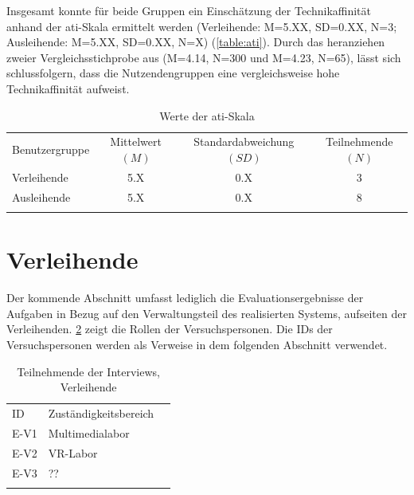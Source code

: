 Insgesamt konnte für beide Gruppen ein Einschätzung der Technikaffinität anhand
der \ac{ati}-Skala ermittelt werden (Verleihende: M=5.XX, SD=0.XX, N=3;
Ausleihende: M=5.XX, SD=0.XX, N=X) (\ref{table:ati}). Durch das heranziehen
zweier Vergleichsstichprobe aus  (M=4.14, N=300 und
M=4.23, N=65), lässt sich schlussfolgern, dass die Nutzendengruppen eine
vergleichsweise hohe Technikaffinität aufweist.


\begin{table}[h]
  \centering
  \caption{Werte der \ac{ati}-Skala}
  \begin{tabular}{lccc}
    \arrayrulecolor{maincolor}\hline
    \sffamily\color{maincolor}Benutzergruppe            &
    \sffamily\color{maincolor}Mittelwert $(M)$          &
    \sffamily\color{maincolor}Standardabweichung $(SD)$ &
    \sffamily\color{maincolor}Teilnehmende $(N)$                        \\
    \arrayrulecolor{maincolor}\hline
    Verleihende                                         & 5.X & 0.X & 3 \\
    Ausleihende                                         & 5.X & 0.X & 8 \\
    \arrayrulecolor{maincolor}\hline
  \end{tabular}
  \label{table:atipartzwei}
\end{table}


\section{Verleihende}
Der kommende Abschnitt umfasst lediglich die Evaluationsergebnisse der Aufgaben
in Bezug auf den Verwaltungsteil des realisierten Systems, aufseiten der
Verleihenden. \ref{table:vzwei} zeigt die Rollen der Versuchspersonen. Die IDs
der Versuchspersonen werden als Verweise in dem folgenden Abschnitt verwendet.

\begin{table}[h]
  \centering
  \caption{Teilnehmende der Interviews, Verleihende}
  \begin{tabular}{lll}
    \arrayrulecolor{maincolor}\hline
    \sffamily\color{maincolor}ID &
    \sffamily\color{maincolor}Zuständigkeitsbereich \\
    \arrayrulecolor{maincolor}\hline
    E-V1                         & Multimedialabor  \\
    E-V2                         & VR-Labor         \\
    E-V3                         & ??               \\
    \arrayrulecolor{maincolor}\hline
  \end{tabular}
  \label{table:vzwei}
\end{table}

